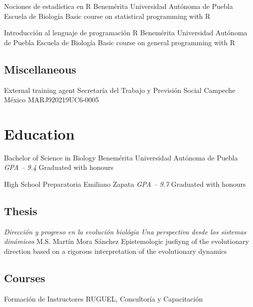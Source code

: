 \documentclass[10pt, letterpaper, roman]{moderncv}
\begin{document}
		{Nociones de estadística en R}
		{}
		{Benemérita Universidad Autónoma de Puebla}
		{Escuela de Biología}
		{Basic course on statistical programming with R}

		{Introducción al lenguaje de programación R}
		{}
		{Benemérita Universidad Autónoma de Puebla}
		{Escuela de Biología}
		{Basic course on general programming with R}

\subsection{Miscellaneous}

		{External training agent}
		{Secretaría del Trabajo y Previsión Social}
		{Campeche}
		{México}
		{MARJ920219UC6-0005}


\section{Education}

		{Bachelor of Science in Biology}
		{Benemérita Universidad Autónoma de Puebla}
		{\newline \em GPA -- 9.4}
		{Graduated with honours}
		{}	
		
		{High School}
		{Preparatoria Emiliano Zapata}
		{\newline \em GPA -- 9.7}
		{Graduated with honours}
		{}

\subsection{Thesis}

  {\em Dirección y progreso en la evolución biológia \newline
  Una perspectiva desde los sistemas dinámicos}
  {M.S. Martín Mora Sánchez}
  {Epistemologic jusfiyng of the evolutionary direction based 
  on a rigorous interpretation of the evolutionary dynamics}

\subsection{Courses}

		{Formación de Instructores}
		{\newline RUGUEL, Consultoría y Capacitación}
		{}
		{}
		{}
\end{document}
